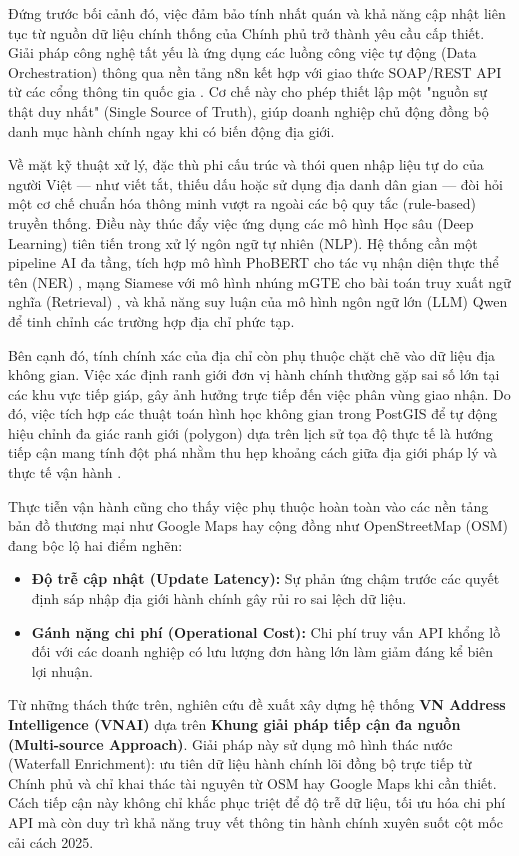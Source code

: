 Đứng trước bối cảnh đó, việc đảm bảo tính nhất quán và khả năng cập nhật liên tục từ nguồn dữ liệu chính thống của Chính phủ trở thành yêu cầu cấp thiết. Giải pháp công nghệ tất yếu là ứng dụng các luồng công việc tự động (Data Orchestration) thông qua nền tảng n8n kết hợp với giao thức SOAP/REST API từ các cổng thông tin quốc gia \cite{n8n}. Cơ chế này cho phép thiết lập một "nguồn sự thật duy nhất" (Single Source of Truth), giúp doanh nghiệp chủ động đồng bộ danh mục hành chính ngay khi có biến động địa giới.

Về mặt kỹ thuật xử lý, đặc thù phi cấu trúc và thói quen nhập liệu tự do của người Việt — như viết tắt, thiếu dấu hoặc sử dụng địa danh dân gian — đòi hỏi một cơ chế chuẩn hóa thông minh vượt ra ngoài các bộ quy tắc (rule-based) truyền thống. Điều này thúc đẩy việc ứng dụng các mô hình Học sâu (Deep Learning) tiên tiến trong xử lý ngôn ngữ tự nhiên (NLP). Hệ thống cần một pipeline AI đa tầng, tích hợp mô hình PhoBERT cho tác vụ nhận diện thực thể tên (NER) \cite{nguyen2020phobert}, mạng Siamese với mô hình nhúng mGTE cho bài toán truy xuất ngữ nghĩa (Retrieval) \cite{mgte2024}, và khả năng suy luận của mô hình ngôn ngữ lớn (LLM) Qwen để tinh chỉnh các trường hợp địa chỉ phức tạp.

Bên cạnh đó, tính chính xác của địa chỉ còn phụ thuộc chặt chẽ vào dữ liệu địa không gian. Việc xác định ranh giới đơn vị hành chính thường gặp sai số lớn tại các khu vực tiếp giáp, gây ảnh hưởng trực tiếp đến việc phân vùng giao nhận. Do đó, việc tích hợp các thuật toán hình học không gian trong PostGIS để tự động hiệu chỉnh đa giác ranh giới (polygon) dựa trên lịch sử tọa độ thực tế là hướng tiếp cận mang tính đột phá nhằm thu hẹp khoảng cách giữa địa giới pháp lý và thực tế vận hành \cite{santos2018geo}.

Thực tiễn vận hành cũng cho thấy việc phụ thuộc hoàn toàn vào các nền tảng bản đồ thương mại như Google Maps hay cộng đồng như OpenStreetMap (OSM) đang bộc lộ hai điểm nghẽn:
\begin{itemize}
\item \textbf{Độ trễ cập nhật (Update Latency):} Sự phản ứng chậm trước các quyết định sáp nhập địa giới hành chính gây rủi ro sai lệch dữ liệu.
\item \textbf{Gánh nặng chi phí (Operational Cost):} Chi phí truy vấn API khổng lồ đối với các doanh nghiệp có lưu lượng đơn hàng lớn làm giảm đáng kể biên lợi nhuận.
\end{itemize}

Từ những thách thức trên, nghiên cứu đề xuất xây dựng hệ thống \textbf{VN Address Intelligence (VNAI)} dựa trên \textbf{Khung giải pháp tiếp cận đa nguồn (Multi-source Approach)}. Giải pháp này sử dụng mô hình thác nước (Waterfall Enrichment): ưu tiên dữ liệu hành chính lõi đồng bộ trực tiếp từ Chính phủ và chỉ khai thác tài nguyên từ OSM hay Google Maps khi cần thiết. Cách tiếp cận này không chỉ khắc phục triệt để độ trễ dữ liệu, tối ưu hóa chi phí API mà còn duy trì khả năng truy vết thông tin hành chính xuyên suốt cột mốc cải cách 2025.

